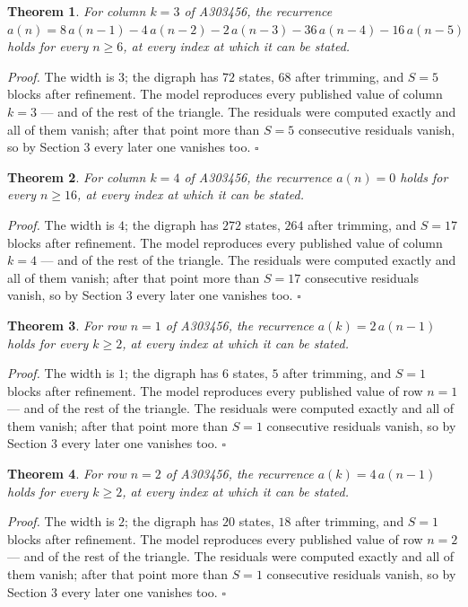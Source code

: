 \documentclass[11pt]{article}
\newtheorem{theorem}{Theorem}
\theoremstyle{definition}
\begin{document}
\begin{theorem} For column $k = 3$ of A303456, the recurrence $a(n) = 8\,a(n-1) - 4\,a(n-2) - 2\,a(n-3) - 36\,a(n-4) - 16\,a(n-5)$ holds for every $n \ge 6$, at every index at which it can be stated.\end{theorem}

{\itshape Proof.} The width is $3$; the digraph has $72$ states, $68$ after trimming, and $S = 5$ blocks after refinement. The model reproduces every published value of column $k = 3$ --- and of the rest of the triangle. The residuals were computed exactly and all of them vanish; after that point more than $S = 5$ consecutive residuals vanish, so by Section 3 every later one vanishes too. $\square$

\begin{theorem} For column $k = 4$ of A303456, the recurrence $a(n) = 0$ holds for every $n \ge 16$, at every index at which it can be stated.\end{theorem}

{\itshape Proof.} The width is $4$; the digraph has $272$ states, $264$ after trimming, and $S = 17$ blocks after refinement. The model reproduces every published value of column $k = 4$ --- and of the rest of the triangle. The residuals were computed exactly and all of them vanish; after that point more than $S = 17$ consecutive residuals vanish, so by Section 3 every later one vanishes too. $\square$

\begin{theorem} For row $n = 1$ of A303456, the recurrence $a(k) = 2\,a(n-1)$ holds for every $k \ge 2$, at every index at which it can be stated.\end{theorem}

{\itshape Proof.} The width is $1$; the digraph has $6$ states, $5$ after trimming, and $S = 1$ blocks after refinement. The model reproduces every published value of row $n = 1$ --- and of the rest of the triangle. The residuals were computed exactly and all of them vanish; after that point more than $S = 1$ consecutive residuals vanish, so by Section 3 every later one vanishes too. $\square$

\begin{theorem} For row $n = 2$ of A303456, the recurrence $a(k) = 4\,a(n-1)$ holds for every $k \ge 2$, at every index at which it can be stated.\end{theorem}

{\itshape Proof.} The width is $2$; the digraph has $20$ states, $18$ after trimming, and $S = 1$ blocks after refinement. The model reproduces every published value of row $n = 2$ --- and of the rest of the triangle. The residuals were computed exactly and all of them vanish; after that point more than $S = 1$ consecutive residuals vanish, so by Section 3 every later one vanishes too. $\square$
\end{document}
